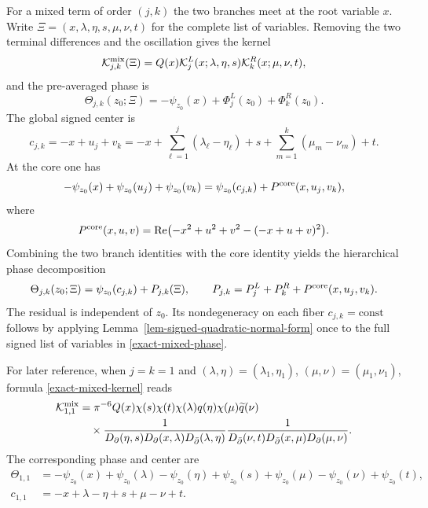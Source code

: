 \documentclass[a4paper,11pt]{article}
\theoremstyle{plain}
\theoremstyle{definition}
\theoremstyle{remark}
\begin{document}
For a mixed term of order $(j,k)$ the two branches meet at the root variable
$x$. Write $\Xi=(x,\lambda,\eta,s,\mu,\nu,t)$ for the complete list of variables. Removing the two terminal differences and the oscillation gives the kernel
\begin{equation}\label{exact-mixed-kernel}
        \mathcal K_{j,k}^{\rm mix}(\Xi)
        =Q(x)\mathcal K_j^L(x;\lambda,\eta,s)
              \mathcal K_k^R(x;\mu,\nu,t),
\end{equation}
and the pre-averaged phase is
\begin{equation}\label{exact-mixed-phase}
        \Theta_{j,k}(z_0;\Xi)
        =-\psi_{z_0}(x)+\Phi_j^L(z_0)+\Phi_k^R(z_0).
\end{equation}
The global signed center is
\begin{equation}\label{exact-mixed-center}
        c_{j,k}=-x+u_j+v_k
        =-x+\sum_{\ell=1}^j(\lambda_\ell-\eta_\ell)+s
           +\sum_{m=1}^k(\mu_m-\nu_m)+t .
\end{equation}
At the core one has
\begin{equation}\label{exact-core-phase-split}
-\psi_{z_0}(x)+\psi_{z_0}(u_j)+\psi_{z_0}(v_k)
 =\psi_{z_0}(c_{j,k})+P^{\rm core}(x,u_j,v_k),
\end{equation}
where
\begin{equation}\label{exact-core-residual-phase}
P^{\rm core}(x,u,v)
 =\operatorname{Re}\bigl(-x^2+u^2+v^2-(-x+u+v)^2\bigr).
\end{equation}
Combining the two branch identities with the core identity yields the
hierarchical phase decomposition
\begin{equation}\label{exact-mixed-phase-split}
        \Theta_{j,k}(z_0;\Xi)
        =\psi_{z_0}(c_{j,k})+P_{j,k}(\Xi),
        \qquad
        P_{j,k}=P_j^L+P_k^R+P^{\rm core}(x,u_j,v_k).
\end{equation}
The residual is independent of $z_0$.  Its nondegeneracy on each fiber
$c_{j,k}=\mathrm{const}$ follows by applying
Lemma~\ref{lem-signed-quadratic-normal-form} once to the full signed list of
variables in \eqref{exact-mixed-phase}.

For later reference, when $j=k=1$ and
$(\lambda,\eta)=(\lambda_1,\eta_1)$,
$(\mu,\nu)=(\mu_1,\nu_1)$, formula \eqref{exact-mixed-kernel} reads
\begin{align}
\mathcal K_{1,1}^{\rm mix}
&=\pi^{-6}Q(x)\chi(s)\chi(t)\chi(\lambda)q(\eta)
  \chi(\mu)\widetilde q(\nu)                                  \notag\\
&\quad\times
\frac{1}{D_\partial(\eta,s)D_\partial(x,\lambda)
        D_{\bar\partial}(\lambda,\eta)}
\frac{1}{D_{\bar\partial}(\nu,t)D_{\bar\partial}(x,\mu)
        D_\partial(\mu,\nu)} .                       \label{exact-mixed-kernel-11}
\end{align}
The corresponding phase and center are
\begin{align}
\Theta_{1,1}
&=-\psi_{z_0}(x)+\psi_{z_0}(\lambda)-\psi_{z_0}(\eta)
  +\psi_{z_0}(s)+\psi_{z_0}(\mu)-\psi_{z_0}(\nu)
  +\psi_{z_0}(t),                                      \label{exact-mixed-phase-11}\\
 c_{1,1}
&=-x+\lambda-\eta+s+\mu-\nu+t .                         \label{exact-mixed-center-11}
\end{align}
\end{document}
